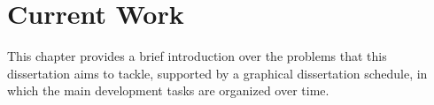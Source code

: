 \chapter{Current Work}\label{c:currWork}

This chapter provides a brief introduction over the problems that this dissertation aims to tackle, supported by a graphical dissertation schedule, in which the main development tasks are organized over time.